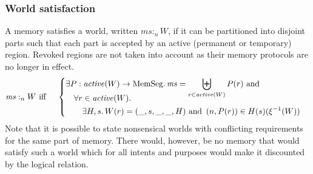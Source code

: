 \documentclass{llncs}
\newcommand{\var}[1]{\mathit{#1}}
\newcommand{\hs}{\var{ms}}
\newcommand{\ms}{\hs}
\newcommand{\heap}{\var{mem}}
\newcommand{\plainfun}[2]{
  \ifthenelse{\equal{#2}{}}
  {\mathit{#1}}
  {\mathit{#1}(#2)}
}
\newcommand{\activeReg}[1]{\plainfun{active}{#1}}
\newcommand{\heapSat}[3][\heap]{#1 :_{#2} #3}
\newcommand{\memSat}[3][n]{\heapSat[#2]{#1}{#3}}
\newcommand{\plaindom}[1]{\mathrm{#1}}
\newcommand{\HeapSegments}{\plaindom{MemSeg}}
\newcommand{\npair}[2][n]{\left(#1,#2 \right)}
\begin{document}

\subsubsection{World satisfaction}
A memory satisfies a world, written $\memSat{\ms}{W}$, if it can be partitioned
into disjoint parts such that each part is accepted by an active (permanent or
temporary) region.  Revoked regions are not taken into account as their memory protocols are no longer in effect.
\begin{align*}
  &\memSat{\ms}{W}
    \text{ iff }\quad \left\{\begin{aligned}
        &\exists P : \activeReg{W} \rightarrow \HeapSegments \ldotp \hs = \biguplus_{r\in\activeReg{W}}P(r) \text{ and } \\[-.35cm]
        &\quad \forall r \in \activeReg{W} \ldotp\\
        &\quad \quad \exists H,s \ldotp W(r) = (\_,s,\_,\_,H) \text{ and } \npair[n]{P(r)} \in H(s)(\xi^{-1}(W))\\
      \end{aligned}\right.
\end{align*}
Note that it is possible to state nonsensical worlds with conflicting
requirements for the same part of memory. There would, however, be no
memory that would satisfy such a world which for all intents and purposes would
make it discounted by the logical relation.
\end{document}
